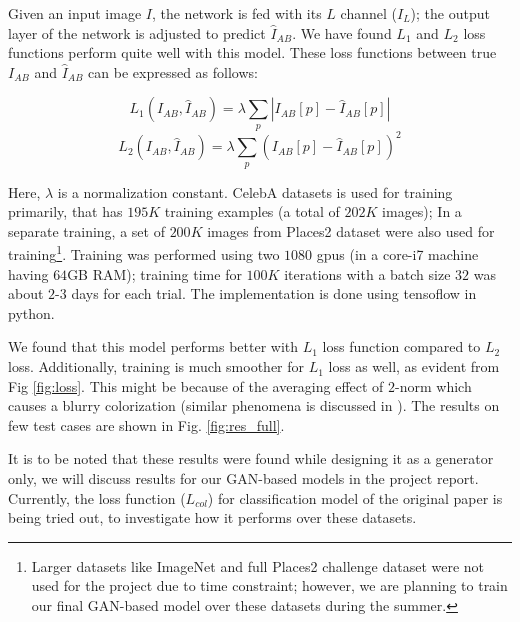 \documentclass[10pt]{article}
\begin{document}
Given an input image $I$, the network is fed with its $L$ channel ($I_L$); the output layer of the network is adjusted to predict $\hat{I}_{AB}$. We have found $L_1$ and $L_2$ loss functions perform quite well with this model. These loss functions between true $I_{AB}$ and $\hat{I}_{AB}$ can be expressed as follows:

\[ L_1 (I_{AB}, \hat{I}_{AB}) = \lambda \sum_p | I_{AB}[p] - \hat{I}_{AB}[p] | \]  
\[ L_2 (I_{AB}, \hat{I}_{AB}) = \lambda \sum_p ( I_{AB}[p] - \hat{I}_{AB}[p] )^2 \]  

Here, $\lambda$ is a normalization constant. CelebA datasets \cite{celebA} is used for training primarily, that has $195K$ training examples (a total of  $202K$ images); 
In a separate training, a set of $200K$ images from Places2 dataset \cite{places2} were also used for training\footnote{Larger datasets like ImageNet \cite{deng2009imagenet} and full Places2 challenge dataset were not used for the project due to time constraint; however, we are planning to train our final GAN-based model over these datasets during the summer.}. Training was performed using two $1080$ gpus (in a core-i7 machine having $64$GB RAM); training time for $100K$ iterations with a batch size $32$ was about $2$-$3$ days for each trial. The implementation is done using tensoflow \cite{abadi2016tensorflow} in python.    


We found that this model performs better with $L_1$ loss function compared to $L_2$ loss. Additionally, training is much smoother for $L_1$ loss as well, as evident from Fig \ref{fig:loss}. This might be because of the averaging effect of $2$-norm which causes a blurry colorization (similar phenomena is discussed in \cite{zhang2016colorful}). The results on few test cases are shown in Fig. \ref{fig:res_full}. 

It is to be noted that these results were found while designing it as a generator only, we will discuss results for our GAN-based models in the project report. Currently, the loss function ($L_{col}$) for classification model of the original paper is being tried out, to investigate how it performs over these datasets.    

 
\end{document}

